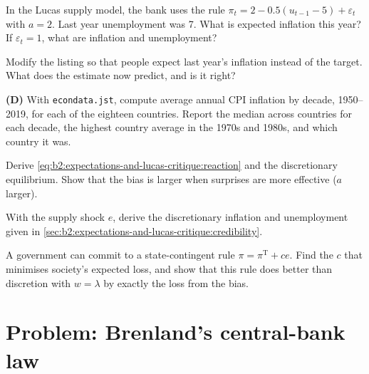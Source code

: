 \begin{exercise}[$\star\star$]\label{exo:b2:expectations-and-lucas-critique:7}
In the Lucas supply model, the bank uses the rule $\pi_t = 2 - 0.5(u_{t-1} - 5) + \varepsilon_t$ with $a = 2$. Last year unemployment was 7. What is expected inflation this year? If $\varepsilon_t = 1$, what are
inflation and unemployment?
\end{exercise}

\begin{exercise}[$\star\star$]\label{exo:b2:expectations-and-lucas-critique:8}
Modify the listing so that people expect last year's inflation instead of the target. What does the estimate now predict,
and is it right?
\end{exercise}

\begin{exercise}[$\star\star$]\label{exo:b2:expectations-and-lucas-critique:9}
\textbf{(D)}
With \texttt{econdata.jst}, compute average annual CPI inflation by decade, 1950--2019, for each of the eighteen countries. Report the
median across countries for each decade, the highest country average in the 1970s and 1980s, and which country it was.
\end{exercise}

\begin{exercise}[$\star\star\star$]\label{exo:b2:expectations-and-lucas-critique:10}
Derive \eqref{eq:b2:expectations-and-lucas-critique:reaction} and the discretionary equilibrium. Show that the bias is larger when surprises are more effective ($a$ larger).
\end{exercise}

\begin{exercise}[$\star\star\star$]\label{exo:b2:expectations-and-lucas-critique:11}
With the supply shock $e$, derive the discretionary inflation and unemployment given in
\cref{sec:b2:expectations-and-lucas-critique:credibility}.
\end{exercise}

\begin{exercise}[$\star\star\star$]\label{exo:b2:expectations-and-lucas-critique:12}
A government can commit to a state-contingent rule $\pi = \pi^{\mathrm T} + ce$. Find the $c$ that minimises society's expected loss, and show that this rule does
better than discretion with $w = \lambda$ by exactly the loss from the bias.
\end{exercise}

\section{Problem: Brenland's central-bank law}\label{sec:b2:expectations-and-lucas-critique:problem}

